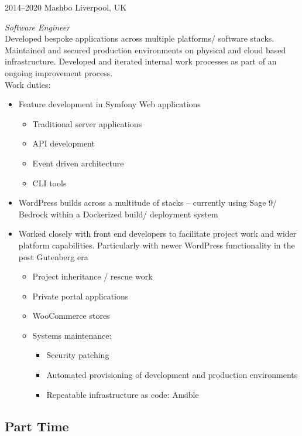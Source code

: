 \documentclass[]{friggeri-cv} %
\begin{document}
\begin{entrylist}


\entry
{2014--2020}
{Mashbo}
{Liverpool, UK}
{\emph{Software Engineer} \\
Developed bespoke applications across multiple platforms/ software stacks.  
Maintained and secured production environments on physical and cloud based infrastructure.
Developed and iterated internal work processes as part of an ongoing improvement process.\\
Work duties:
\begin{itemize}
\item Feature development in Symfony Web applications
\begin{itemize}
\item Traditional server applications
\item API development
\item Event driven architecture
\item CLI tools
\end{itemize}
\item WordPress builds across a multitude of stacks -- currently using Sage 9/ Bedrock within a Dockerized build/ deployment system
\item Worked closely with front end developers to facilitate project work and wider platform capabilities.  Particularly with newer WordPress functionality in the post Gutenberg era
\begin{itemize}
\item Project inheritance / rescue work
\item Private portal applications
\item WooCommerce stores
\item Systems maintenance:
\begin{itemize}
\item Security patching
\item Automated provisioning of development and production environments
\item Repeatable infrastructure as code: Ansible
\end{itemize}
\end{itemize}
\end{itemize}}


\end{entrylist}

\subsection{Part Time}
\end{document}

